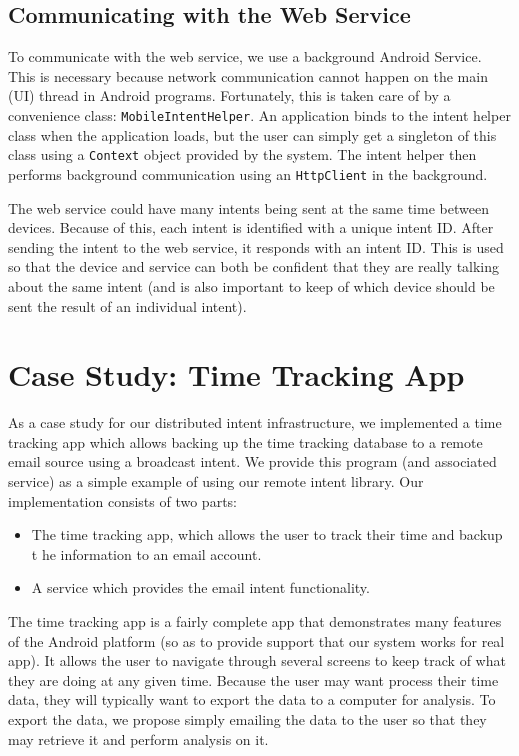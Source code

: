 \documentclass{acm_proc_article-sp}
\begin{document}
\subsection{Communicating with the Web Service} 

To communicate with the web service, we use a background Android
Service.  This is necessary because network communication cannot
happen on the main (UI) thread in Android programs.  Fortunately, this
is taken care of by a convenience class: \texttt{MobileIntentHelper}.
An application binds to the intent helper class when the application
loads, but the user can simply get a singleton of this class using a
\texttt{Context} object provided by the system.  The intent helper
then performs background communication using an \texttt{HttpClient} in
the background.

The web service could have many intents being sent at the same time
between devices.  Because of this, each intent is identified with a
unique intent ID.  After sending the intent to the web service, it
responds with an intent ID.  This is used so that the device and
service can both be confident that they are really talking about the
same intent (and is also important to keep of which device should be
sent the result of an individual intent).

\section{Case Study: Time Tracking App}
\label{section:case-study}

As a case study for our distributed intent infrastructure, we
implemented a time tracking app which allows backing up the time
tracking database to a remote email source using a broadcast intent.
We provide this program (and associated service) as a simple example
of using our remote intent library.  Our implementation consists of
two parts:

\begin{itemize}
\item The time tracking app, which allows the user to track their time
  and backup t he information to an email account.
\item A service which provides the email intent functionality.
\end{itemize}

The time tracking app is a fairly complete app that demonstrates many
features of the Android platform (so as to provide support that our
system works for real app).  It allows the user to navigate through
several screens to keep track of what they are doing at any given
time.  Because the user may want process their time data, they will
typically want to export the data to a computer for analysis.  To
export the data, we propose simply emailing the data to the user so
that they may retrieve it and perform analysis on it.  
\end{document}
